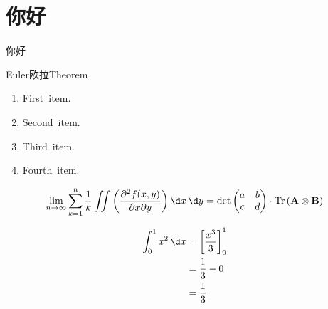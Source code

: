 \documentclass[10pt]{atombook}
\begin{document}
\chapter{你好}
你好
\zhlipsum*[1]
\begin{mybox}[colframe=cyan]{Euler欧拉Theorem}
    \begin{enumerate}
        \item First~item.
        \item Second~item.
        \item Third~item.
        \item Fourth~item.
    \end{enumerate}
    \zhlipsum*[3]
\end{mybox}

\[ 
\lim_{n \to \infty} \sum_{k=1}^{n} \frac{1}{k} \iint
\left( \frac{\partial^{2} f(x,y)}{\partial x \partial y} \right) \d x \, \d y 
= \det \begin{pmatrix} a & b \\ c & d \end{pmatrix} 
\cdot \operatorname{Tr} \left( \mathbf{A} \otimes \mathbf{B} \right)
\]

\zhlipsum*[1]
\begin{align}
\int_{0}^{1} x^{2} \, \d x 
&= \left[ \frac{x^{3}}{3} \right]_{0}^{1} \\
&= \frac{1}{3} - 0 \\
&= \frac{1}{3}
\end{align}

\zhlipsum*[name=zhufu]
\end{document}
